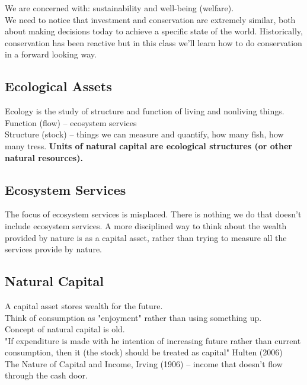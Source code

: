 \documentclass{article}
\begin{document}
We are concerned with: sustainability and well-being (welfare). \\

We need to notice that investment and conservation are extremely similar, both about making decisions today to achieve a specific state of the world. Historically, conservation has been reactive but in this class we'll learn how to do conservation in a forward looking way. 

\subsection{Ecological Assets}
Ecology is the study of structure and function of living and nonliving things. \\

Function (flow) -- ecosystem services \\

Structure (stock) -- things we can measure and quantify, how many fish, how many tress. \textbf{Units of natural capital are ecological structures (or other natural resources).}

\subsection{Ecosystem Services}
The focus of ecosystem services is misplaced. There is nothing we do that doesn't include ecosystem services. A more disciplined way to think about the wealth provided by nature is as a capital asset, rather than trying to measure all the services provide by nature. 

\subsection{Natural Capital}
A capital asset stores wealth for the future. \\

Think of consumption as "enjoyment" rather than using something up. \\

Concept of natural capital is old. \\

"If expenditure is made with he intention of increasing future rather than current consumption, then it (the stock) should be treated as capital" Hulten (2006) \\

The Nature of Capital and Income, Irving (1906) -- income that doesn't flow through the cash door. \\\
\end{document}
